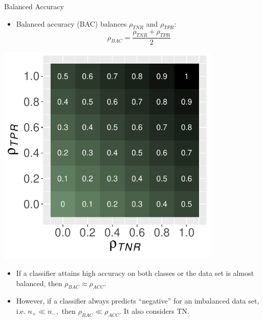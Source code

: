\documentclass[11pt,compress,t,notes=noshow, xcolor=table]{beamer}
\begin{document}
\begin{vbframe}{Balanced Accuracy}
	\footnotesize{
	
    	\begin{minipage}[c]{0.49\textwidth}
    		\begin{itemize}
    			\item Balanced accuracy (BAC) balances $\rho_{TNR}$ and $\rho_{TPR}$: 
    			$$\rho_{BAC} = \frac{\rho_{TNR} + \rho_{TPR}}{2}$$

    		\end{itemize}
    	\end{minipage}
    	\begin{minipage}[c]{0.49\textwidth}
    		\centering
    		\includegraphics[width=0.8\textwidth]{figure/bac_plot.pdf}
    	\end{minipage}

    	\begin{itemize}
    		\item If a classifier attains high accuracy on both classes or the data set is almost balanced, then $\rho_{BAC} \approx \rho_{ACC}$.
            \vspace{20pt}
            
    		\item However, if a classifier always predicts ``negative'' for an imbalanced data set, i.e. $n_+  \ll n_-,$ then $\rho_{BAC} \ll \rho_{ACC}$. It also considers TN.
    
    	\end{itemize}
    }
\end{vbframe}
\end{document}
